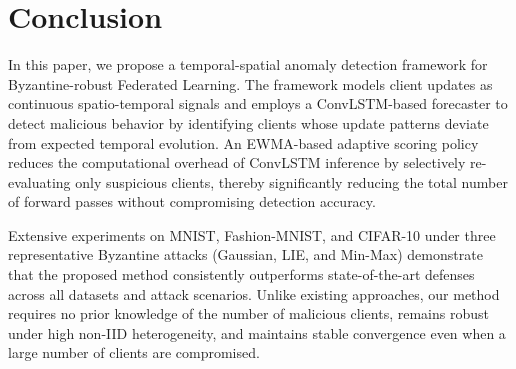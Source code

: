 \documentclass[journal]{IEEEtran}
\begin{document}
\section{Conclusion}
\label{sec:conclusion}

In this paper, we propose a temporal-spatial anomaly detection framework for Byzantine-robust Federated Learning. The framework models client updates as continuous spatio-temporal signals and employs a ConvLSTM-based forecaster to detect malicious behavior by identifying clients whose update patterns deviate from expected temporal evolution. An EWMA-based adaptive scoring policy reduces the computational overhead of ConvLSTM inference by selectively re-evaluating only suspicious clients, thereby significantly reducing the total number of forward passes without compromising detection accuracy.

Extensive experiments on MNIST, Fashion-MNIST, and CIFAR-10 under three representative Byzantine attacks (Gaussian, LIE, and Min-Max) demonstrate that the proposed method consistently outperforms state-of-the-art defenses across all datasets and attack scenarios. Unlike existing approaches, our method requires no prior knowledge of the number of malicious clients, remains robust under high non-IID heterogeneity, and maintains stable convergence even when a large number of clients are compromised.
\end{document}
